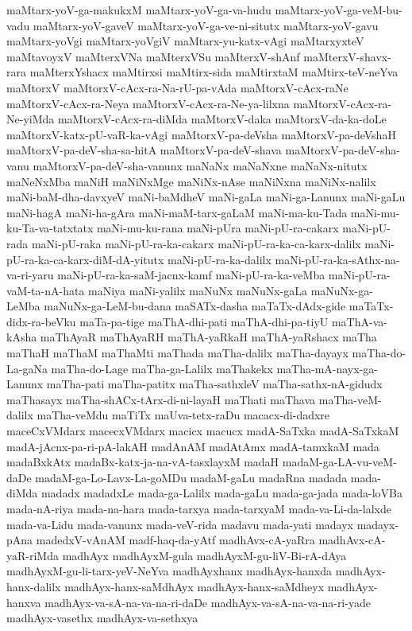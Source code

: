 {maMtarx-yoV-ga-makukxM
maMtarx-yoV-ga-va-hudu
maMtarx-yoV-ga-veM-bu-vadu
maMtarx-yoV-gaveV
maMtarx-yoV-ga-ve-ni-situtx
maMtarx-yoV-gavu
maMtarx-yoVgi
maMtarx-yoVgiV
maMtarx-yu-katx-vAgi
maMtarxyxteV
maMtavoyxV
maMterxVNa
maMterxVSu
maMterxV-shAnf
maMterxV-shavx-rara
maMterxYshacx
maMtirxsi
maMtirx-sida
maMtirxtaM
maMtirx-teV-neYva
maMtorxV
maMtorxV-cAcx-ra-Na-rU-pa-vAda
maMtorxV-cAcx-raNe
maMtorxV-cAcx-ra-Neya
maMtorxV-cAcx-ra-Ne-ya-lilxna
maMtorxV-cAcx-ra-Ne-yiMda
maMtorxV-cAcx-ra-diMda
maMtorxV-daka
maMtorxV-da-ka-doLe
maMtorxV-katx-pU-vaR-ka-vAgi
maMtorxV-pa-deVsha
maMtorxV-pa-deVshaH
maMtorxV-pa-deV-sha-sa-hitA
maMtorxV-pa-deV-shava
maMtorxV-pa-deV-sha-vanu
maMtorxV-pa-deV-sha-vanunx
maNaNx
maNaNxne
maNaNx-nitutx
maNeNxMba
maNiH
maNiNxMge
maNiNx-nAse
maNiNxna
maNiNx-nalilx
maNi-baM-dha-davxyeV
maNi-baMdheV
maNi-gaLa
maNi-ga-Lanunx
maNi-gaLu
maNi-hagA
maNi-ha-gAra
maNi-maM-tarx-gaLaM
maNi-ma-ku-Tada
maNi-mu-ku-Ta-va-tatxtatx
maNi-mu-ku-rana
maNi-pUra
maNi-pU-ra-cakarx
maNi-pU-rada
maNi-pU-raka
maNi-pU-ra-ka-cakarx
maNi-pU-ra-ka-ca-karx-dalilx
maNi-pU-ra-ka-ca-karx-diM-dA-yitutx
maNi-pU-ra-ka-dalilx
maNi-pU-ra-ka-sAthx-na-va-ri-yaru
maNi-pU-ra-ka-saM-jacnx-kamf
maNi-pU-ra-ka-veMba
maNi-pU-ra-vaM-ta-nA-hata
maNiya
maNi-yalilx
maNuNx
maNuNx-gaLa
maNuNx-ga-LeMba
maNuNx-ga-LeM-bu-dana
maSATx-dasha
maTaTx-dAdx-gide
maTaTx-didx-ra-beVku
maTa-pa-tige
maThA-dhi-pati
maThA-dhi-pa-tiyU
maThA-va-kAsha
maThAyaR
maThAyaRH
maThA-yaRkaH
maThA-yaRshacx
maTha
maThaH
maThaM
maThaMti
maThada
maTha-dalilx
maTha-dayayx
maTha-do-La-gaNa
maTha-do-Lage
maTha-ga-Lalilx
maThakekx
maTha-mA-nayx-ga-Lanunx
maTha-pati
maTha-patitx
maTha-sathxleV
maTha-sathx-nA-gidudx
maThasayx
maTha-shACx-tArx-di-ni-layaH
maThati
maThava
maTha-veM-dalilx
maTha-veMdu
maTiTx
maUva-tetx-raDu
macacx-di-dadxre
maceCxVMdarx
macecxVMdarx
macicx
macucx
madA-SaTxka
madA-SaTxkaM
madA-jAcnx-pa-ri-pA-lakAH
madAnAM
madAtAmx
madA-tamxkaM
mada
madaBxkAtx
madaBx-katx-ja-na-vA-tasxlayxM
madaH
madaM-ga-LA-vu-veM-daDe
madaM-ga-Lo-Lavx-La-goMDu
madaM-gaLu
madaRna
madada
mada-diMda
madadx
madadxLe
mada-ga-Lalilx
mada-gaLu
mada-ga-jada
mada-loVBa
mada-nA-riya
mada-na-hara
mada-tarxya
mada-tarxyaM
mada-va-Li-da-lalxde
mada-va-Lidu
mada-vanunx
mada-veV-rida
madavu
mada-yati
madayx
madayx-pAna
madedxV-vAnAM
madf-haq-da-yAtf
madhAvx-cA-yaRra
madhAvx-cA-yaR-riMda
madhAyx
madhAyxM-gula
madhAyxM-gu-liV-Bi-rA-dAya
madhAyxM-gu-li-tarx-yeV-NeYva
madhAyxhanx
madhAyx-hanxda
madhAyx-hanx-dalilx
madhAyx-hanx-saMdhAyx
madhAyx-hanx-saMdheyx
madhAyx-hanxva
madhAyx-va-sA-na-va-na-ri-daDe
madhAyx-va-sA-na-va-na-ri-yade
madhAyx-vasethx
madhAyx-va-sethxya
}
